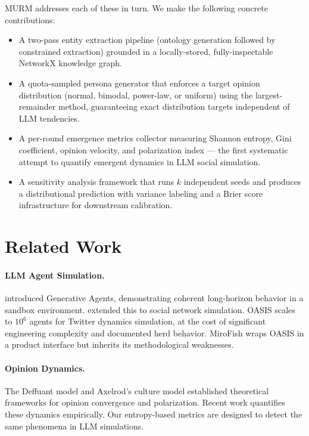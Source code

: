 \documentclass[10pt,twocolumn]{article}
\begin{document}
\textsc{MURM} addresses each of these in turn. We make the following concrete contributions:

\begin{itemize}
  \item A two-pass entity extraction pipeline (ontology generation followed by constrained extraction) grounded in a locally-stored, fully-inspectable NetworkX knowledge graph.
  \item A quota-sampled persona generator that enforces a target opinion distribution (normal, bimodal, power-law, or uniform) using the largest-remainder method, guaranteeing exact distribution targets independent of LLM tendencies.
  \item A per-round emergence metrics collector measuring Shannon entropy, Gini coefficient, opinion velocity, and polarization index — the first systematic attempt to quantify emergent dynamics in LLM social simulation.
  \item A sensitivity analysis framework that runs $k$ independent seeds and produces a distributional prediction with variance labeling and a Brier score infrastructure for downstream calibration.
\end{itemize}

\section{Related Work}

\paragraph{LLM Agent Simulation.} \citet{park2023generative} introduced Generative Agents, demonstrating coherent long-horizon behavior in a sandbox environment. \citet{gao2023s3} extended this to social network simulation. OASIS \cite{oasis2024} scales to $10^6$ agents for Twitter dynamics simulation, at the cost of significant engineering complexity and documented herd behavior. MiroFish \cite{mirofish2025} wraps OASIS in a product interface but inherits its methodological weaknesses.

\paragraph{Opinion Dynamics.} The Deffuant model \cite{deffuant2000mixing} and Axelrod's culture model \cite{axelrod1997dissemination} established theoretical frameworks for opinion convergence and polarization. Recent work \cite{bail2018exposure, brady2021MAD} quantifies these dynamics empirically. Our entropy-based metrics are designed to detect the same phenomena in LLM simulations.
\end{document}
